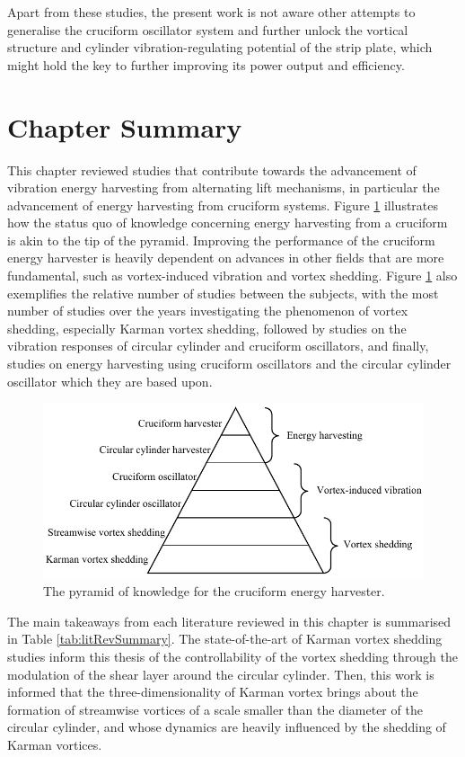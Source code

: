 \documentclass[oneside]{utmthesis}
\begin{document}
Apart from these studies, the present work is not aware other attempts to generalise the cruciform oscillator system and further unlock the vortical structure and cylinder vibration-regulating potential of the strip plate, which might hold the key to further improving its power output and efficiency.

\section{Chapter Summary}
This chapter reviewed studies that contribute towards the advancement of vibration energy harvesting from alternating lift mechanisms, in particular the advancement of energy harvesting from cruciform systems. Figure \ref{fig:pyramidOfKnowledge} illustrates how the status quo of knowledge concerning energy harvesting from a cruciform is akin to the tip of the pyramid. Improving the performance of the cruciform energy harvester is heavily dependent on advances in other fields that are more fundamental, such as vortex-induced vibration and vortex shedding. Figure \ref{fig:pyramidOfKnowledge} also exemplifies the relative number of studies between the subjects, with the most number of studies over the years investigating the phenomenon of vortex shedding, especially Karman vortex shedding, followed by studies on the vibration responses of circular cylinder and cruciform oscillators, and finally, studies on energy harvesting using cruciform oscillators and the circular cylinder oscillator which they are based upon.

\begin{figure}
  \centering
    \includegraphics[width=\textwidth]{figs/pyramidOfKnowledge}
    \caption{The pyramid of knowledge for the cruciform energy harvester.}
    \label{fig:pyramidOfKnowledge}
\end{figure}

The main takeaways from each literature reviewed in this chapter is summarised in Table \ref{tab:litRevSummary}. The state-of-the-art of Karman vortex shedding studies inform this thesis of the controllability of the vortex shedding through the modulation of the shear layer around the circular cylinder. Then, this work is informed that the three-dimensionality of Karman vortex brings about the formation of streamwise vortices of a scale smaller than the diameter of the circular cylinder, and whose dynamics are heavily influenced by the shedding of Karman vortices.
\end{document}

